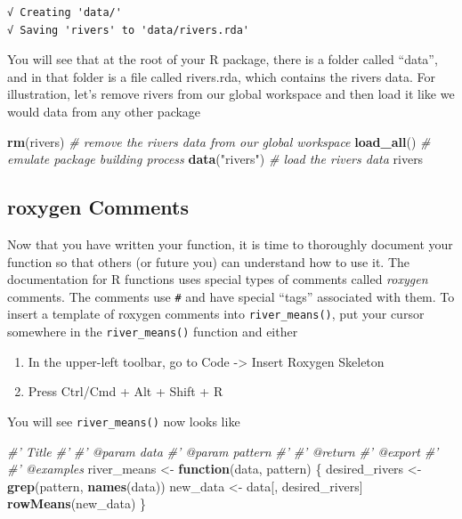 \documentclass[
]{book}
\newenvironment{Shaded}{\begin{snugshade}}{\end{snugshade}}
\newcommand{\CommentTok}[1]{\textcolor[rgb]{0.56,0.35,0.01}{\textit{#1}}}
\newcommand{\ControlFlowTok}[1]{\textcolor[rgb]{0.13,0.29,0.53}{\textbf{#1}}}
\newcommand{\KeywordTok}[1]{\textcolor[rgb]{0.13,0.29,0.53}{\textbf{#1}}}
\newcommand{\NormalTok}[1]{#1}
\newcommand{\StringTok}[1]{\textcolor[rgb]{0.31,0.60,0.02}{#1}}
\providecommand{\tightlist}{%
  \setlength{\itemsep}{0pt}\setlength{\parskip}{0pt}}
\begin{document}
\begin{verbatim}
√ Creating 'data/'
√ Saving 'rivers' to 'data/rivers.rda'
\end{verbatim}

You will see that at the root of your R package, there is a folder called ``data'', and in that folder is a file called rivers.rda, which contains the rivers data. For illustration, let's remove rivers from our global workspace and then load it like we would data from any other package

\begin{Shaded}
\begin{Highlighting}[]
\KeywordTok{rm}\NormalTok{(rivers) }\CommentTok{# remove the rivers data from our global workspace}
\KeywordTok{load_all}\NormalTok{() }\CommentTok{# emulate package building process}
\KeywordTok{data}\NormalTok{(}\StringTok{"rivers"}\NormalTok{) }\CommentTok{# load the rivers data}
\NormalTok{rivers}
\end{Highlighting}
\end{Shaded}

\hypertarget{roxygen-comments}{%
\subsection{roxygen Comments}\label{roxygen-comments}}

Now that you have written your function, it is time to thoroughly document your function so that others (or future you) can understand how to use it. The documentation for R functions uses special types of comments called \emph{roxygen} comments. The comments use \texttt{\#\textquotesingle{}} and have special ``tags'' associated with them. To insert a template of roxygen comments into \texttt{river\_means()}, put your cursor somewhere in the \texttt{river\_means()} function and either

\begin{enumerate}
\def\labelenumi{\arabic{enumi}.}
\tightlist
\item
  In the upper-left toolbar, go to Code -\textgreater{} Insert Roxygen Skeleton
\item
  Press Ctrl/Cmd + Alt + Shift + R
\end{enumerate}

You will see \texttt{river\_means()} now looks like

\begin{Shaded}
\begin{Highlighting}[]
\CommentTok{#' Title}
\CommentTok{#'}
\CommentTok{#' @param data }
\CommentTok{#' @param pattern }
\CommentTok{#'}
\CommentTok{#' @return}
\CommentTok{#' @export}
\CommentTok{#'}
\CommentTok{#' @examples}
\NormalTok{river_means <-}\StringTok{ }\ControlFlowTok{function}\NormalTok{(data, pattern) \{}
\NormalTok{  desired_rivers <-}\StringTok{ }\KeywordTok{grep}\NormalTok{(pattern, }\KeywordTok{names}\NormalTok{(data))}
\NormalTok{  new_data <-}\StringTok{ }\NormalTok{data[, desired_rivers]}
  \KeywordTok{rowMeans}\NormalTok{(new_data)}
\NormalTok{\}}
\end{Highlighting}
\end{Shaded}
\end{document}
